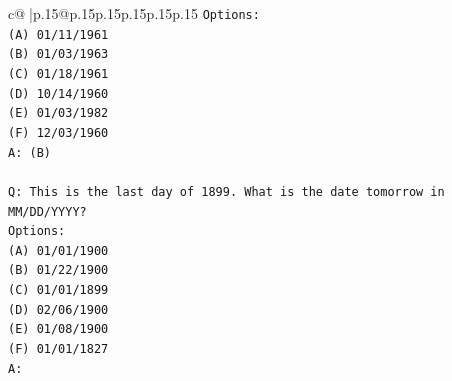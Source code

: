 \documentclass{article}
\begin{document}
{\begin{supertabular}{c@{$\;$}|p{.15\linewidth}@{}p{.15\linewidth}p{.15\linewidth}p{.15\linewidth}p{.15\linewidth}p{.15\linewidth}}
{{{\texttt{Options:} \\
\texttt{(A) 01/11/1961} \\
\texttt{(B) 01/03/1963} \\
\texttt{(C) 01/18/1961} \\
\texttt{(D) 10/14/1960} \\
\texttt{(E) 01/03/1982} \\
\texttt{(F) 12/03/1960} \\
\texttt{A: (B)} \\
\\ 
\texttt{Q: This is the last day of 1899. What is the date tomorrow in MM/DD/YYYY?} \\
\texttt{Options:} \\
\texttt{(A) 01/01/1900} \\
\texttt{(B) 01/22/1900} \\
\texttt{(C) 01/01/1899} \\
\texttt{(D) 02/06/1900} \\
\texttt{(E) 01/08/1900} \\
\texttt{(F) 01/01/1827} \\
\texttt{A:} \\
            }
        }
    }
     \\ \\


\end{supertabular}}
\end{document}
